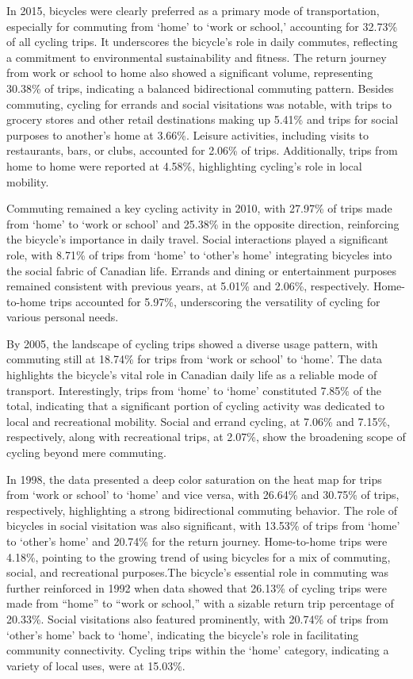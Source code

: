 \documentclass[12pt,twoside]{reedthesis}
\begin{document}
In 2015, bicycles were clearly preferred as a primary mode of transportation, especially for commuting from `home' to `work or school,' accounting for 32.73\% of all cycling trips. It underscores the bicycle's role in daily commutes, reflecting a commitment to environmental sustainability and fitness. The return journey from work or school to home also showed a significant volume, representing 30.38\% of trips, indicating a balanced bidirectional commuting pattern. Besides commuting, cycling for errands and social visitations was notable, with trips to grocery stores and other retail destinations making up 5.41\% and trips for social purposes to another's home at 3.66\%. Leisure activities, including visits to restaurants, bars, or clubs, accounted for 2.06\% of trips. Additionally, trips from home to home were reported at 4.58\%, highlighting cycling's role in local mobility.

Commuting remained a key cycling activity in 2010, with 27.97\% of trips made from `home' to `work or school' and 25.38\% in the opposite direction, reinforcing the bicycle's importance in daily travel. Social interactions played a significant role, with 8.71\% of trips from `home' to `other's home' integrating bicycles into the social fabric of Canadian life. Errands and dining or entertainment purposes remained consistent with previous years, at 5.01\% and 2.06\%, respectively. Home-to-home trips accounted for 5.97\%, underscoring the versatility of cycling for various personal needs.

By 2005, the landscape of cycling trips showed a diverse usage pattern, with commuting still at 18.74\% for trips from `work or school' to `home'. The data highlights the bicycle's vital role in Canadian daily life as a reliable mode of transport. Interestingly, trips from `home' to `home' constituted 7.85\% of the total, indicating that a significant portion of cycling activity was dedicated to local and recreational mobility. Social and errand cycling, at 7.06\% and 7.15\%, respectively, along with recreational trips, at 2.07\%, show the broadening scope of cycling beyond mere commuting.

In 1998, the data presented a deep color saturation on the heat map for trips from `work or school' to `home' and vice versa, with 26.64\% and 30.75\% of trips, respectively, highlighting a strong bidirectional commuting behavior. The role of bicycles in social visitation was also significant, with 13.53\% of trips from `home' to `other's home' and 20.74\% for the return journey. Home-to-home trips were 4.18\%, pointing to the growing trend of using bicycles for a mix of commuting, social, and recreational purposes.The bicycle's essential role in commuting was further reinforced in 1992 when data showed that 26.13\% of cycling trips were made from ``home'' to ``work or school,'' with a sizable return trip percentage of 20.33\%. Social visitations also featured prominently, with 20.74\% of trips from `other's home' back to `home', indicating the bicycle's role in facilitating community connectivity. Cycling trips within the `home' category, indicating a variety of local uses, were at 15.03\%.
\end{document}
